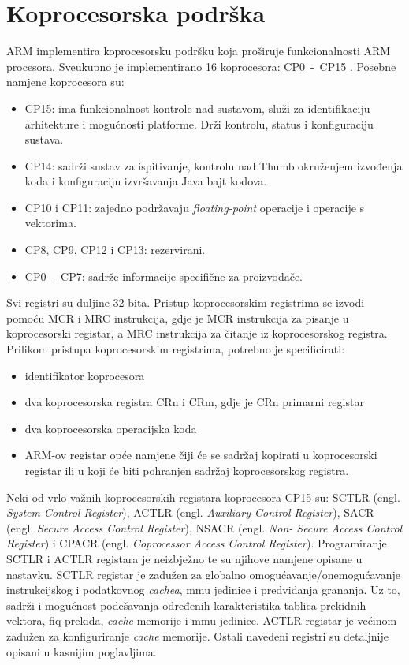 \documentclass[times, utf8, diplomski, numeric]{fer}
\begin{document}
\section{Koprocesorska podrška}
ARM implementira koprocesorsku podršku koja proširuje funkcionalnosti ARM procesora. Sveukupno je implementirano 16 koprocesora:
CP0~-~CP15 \cite{arch_man}. Posebne namjene koprocesora su:
\begin{itemize}
  \item{CP15: ima funkcionalnost kontrole nad sustavom, služi za identifikaciju arhitekture i mogućnosti platforme. Drži
  kontrolu, status i konfiguraciju sustava.}
  \item{CP14: sadrži sustav za ispitivanje, kontrolu nad Thumb okruženjem izvođenja koda i konfiguraciju izvršavanja Java
  bajt kodova.}
  \item{CP10 i CP11: zajedno podržavaju \textit{floating-point} operacije i operacije s vektorima.}
  \item{CP8, CP9, CP12 i CP13: rezervirani.}
  \item{CP0~-~CP7: sadrže informacije specifične za proizvođače.}
\end{itemize}
Svi registri su duljine 32 bita. Pristup koprocesorskim registrima se izvodi pomoću MCR i MRC instrukcija, gdje je MCR
instrukcija za pisanje u koprocesorski registar, a MRC instrukcija za čitanje iz koprocesorskog registra.
Prilikom pristupa koprocesorskim registrima, potrebno je specificirati:
\begin{itemize}
  \item{identifikator koprocesora}
  \item{dva koprocesorska registra CRn i CRm, gdje je CRn primarni registar}
  \item{dva koprocesorska operacijska koda}
  \item{ARM-ov registar opće namjene čiji će se sadržaj kopirati u koprocesorski registar ili u koji će biti pohranjen
  sadržaj koprocesorskog registra.}
\end{itemize}
Neki od vrlo važnih koprocesorskih registara koprocesora CP15 su: SCTLR (engl. \textit{System Control Register}), ACTLR
(engl. \textit{Auxiliary Control Register}), SACR (engl. \textit{Secure Access Control Register}), NSACR (engl. \textit{Non-
Secure Access Control Register}) i CPACR (engl. \textit{Coprocessor Access Control Register}). Programiranje SCTLR i ACTLR
registara je neizbježno te su njihove namjene opisane u nastavku. SCTLR registar je zadužen za globalno
omogućavanje/onemogućavanje instrukcijskog i podatkovnog \textit{cachea}, \gls{mmu} jedinice i predviđanja grananja. Uz to, sadrži
i mogućnost podešavanja određenih karakteristika tablica prekidnih vektora, \gls{fiq} prekida, \textit{cache} memorije i \gls{mmu} jedinice.
ACTLR registar je većinom zadužen za konfiguriranje \textit{cache} memorije. Ostali navedeni registri su detaljnije opisani u
kasnijim poglavljima.
\end{document}
